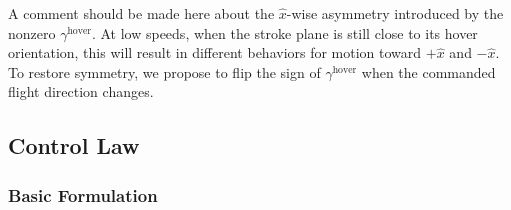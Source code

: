 \documentclass[11pt,letterpaper]{article}
\begin{document}
A comment should be made here about the $\hat{x}$-wise
asymmetry introduced by the nonzero $\gamma^\text{hover}$.
At low speeds, when the stroke plane is still close to
its hover orientation, this will result in different
behaviors for motion toward $+\hat{x}$ and $-\hat{x}$.
To restore symmetry, we propose to flip the sign
of $\gamma^\text{hover}$ when the commanded flight
direction changes.

\subsection{Control Law}\label{sec:control-law}

\subsubsection{Basic Formulation}
\end{document}
